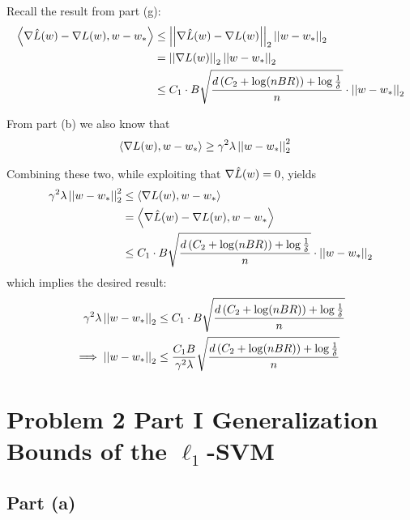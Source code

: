 \documentclass[11pt]{article}
\newcommand{\1}{\mathbb{I}} %
\begin{document}
Recall the result from part (g):
\begin{align}
	\left\langle \nabla \hat L(w) - \nabla L(w), w - w_* \right\rangle	
		&\leq \left|\left| \nabla \hat L(w) - \nabla L(w) \right|\right|_{2} \left|\left| w - w_* \right|\right|_{2} \\
		&= \left|\left| \nabla L(w) \right|\right|_{2} \left|\left| w - w_* \right|\right|_{2} \\ 
		&\leq C_1 \cdot B \sqrt{
		\dfrac{d \left( C_2 + \log(nBR) \right) + \log\frac{1}{\delta}}{n}
	} \cdot \left|\left| w - w_* \right|\right|_{2}
\end{align}

From part (b) we also know that 
\begin{align}
	\left\langle \nabla L(w), w - w_* \right\rangle &\geq \gamma^2 \lambda \left|\left| w - w_* \right|\right|_{2}^2
\end{align}

Combining these two, while exploiting that $\nabla \hat L(w) = 0$,  yields
\begin{align}
	 \gamma^2 \lambda \left|\left| w - w_* \right|\right|_{2}^2 
	 	&\leq \left\langle \nabla L(w), w - w_* \right\rangle \\
	 	&= \left\langle \nabla \hat L(w) - \nabla L(w), w - w_* \right\rangle \\
	 	&\leq  C_1 \cdot B \sqrt{
	 		\dfrac{d \left( C_2 + \log(nBR) \right) + \log\frac{1}{\delta}}{n}
	 	} \cdot \left|\left| w - w_* \right|\right|_{2} 
\end{align}
which implies the desired result:
\begin{align}
	 \gamma^2 \lambda \left|\left| w - w_* \right|\right|_{2}
	 	&\leq C_1 \cdot B \sqrt{
	 		\dfrac{d \left( C_2 + \log(nBR) \right) + \log\frac{1}{\delta}}{n}
	 	} \\
 	\implies \left|\left| w - w_* \right|\right|_{2} 
 		&\leq \frac{C_1 B}{\gamma^2 \lambda} \sqrt{
 		\dfrac{d \left( C_2 + \log(nBR) \right) + \log\frac{1}{\delta}}{n}
 	} 
\end{align}






\clearpage
\section*{Problem 2 Part I Generalization Bounds of the $\ell_1$-SVM}



\myspace
\subsection*{Part (a)}
\end{document}
